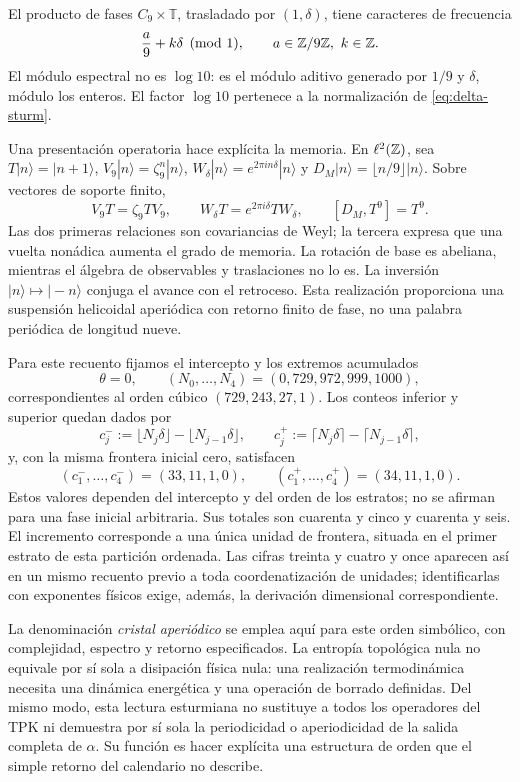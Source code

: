 El producto de fases \(C_9\times\mathbb T\), trasladado por \((1,\delta)\), tiene caracteres de frecuencia
\[
 \frac a9+k\delta\pmod1,\qquad a\in\mathbb Z/9\mathbb Z,\ k\in\mathbb Z.
\]
El módulo espectral no es \(\log10\): es el módulo aditivo generado por \(1/9\) y \(\delta\), módulo los enteros. El factor \(\log10\) pertenece a la normalización de \eqref{eq:delta-sturm}.

Una presentación operatoria hace explícita la memoria. En \(\ell^2(\mathbb Z)\), sea \(T|n\rangle=|n+1\rangle\), \(V_9|n\rangle=\zeta_9^n|n\rangle\), \(W_\delta|n\rangle=e^{2\pi i n\delta}|n\rangle\) y \(D_M|n\rangle=\lfloor n/9\rfloor|n\rangle\). Sobre vectores de soporte finito,
\begin{equation}
 V_9T=\zeta_9TV_9,\qquad
 W_\delta T=e^{2\pi i\delta}TW_\delta,\qquad
 [D_M,T^9]=T^9.
 \label{eq:weyl-relojes}
\end{equation}
Las dos primeras relaciones son covariancias de Weyl; la tercera expresa que una vuelta nonádica aumenta el grado de memoria. La rotación de base es abeliana, mientras el álgebra de observables y traslaciones no lo es. La inversión \(|n\rangle\mapsto|-n\rangle\) conjuga el avance con el retroceso. Esta realización proporciona una suspensión helicoidal aperiódica con retorno finito de fase, no una palabra periódica de longitud nueve.



Para este recuento fijamos el intercepto y los extremos acumulados
\[
 \theta=0,\qquad
 (N_0,\ldots,N_4)=(0,729,972,999,1000),
\]
correspondientes al orden cúbico \((729,243,27,1)\). Los conteos inferior y
superior quedan dados por
\[
 c_j^-:=\lfloor N_j\delta\rfloor-\lfloor N_{j-1}\delta\rfloor,
 \qquad
 c_j^+:=\lceil N_j\delta\rceil-\lceil N_{j-1}\delta\rceil,
\]
y, con la misma frontera inicial cero, satisfacen
\[
 (c_1^-,\ldots,c_4^-)=(33,11,1,0),\qquad
 (c_1^+,\ldots,c_4^+)=(34,11,1,0).
\]
Estos valores dependen del intercepto y del
orden de los estratos; no se afirman para una fase inicial arbitraria. Sus
totales son cuarenta y cinco y cuarenta y seis. El incremento corresponde a
una única unidad de frontera, situada en el primer estrato de esta partición
ordenada. Las cifras treinta y cuatro y once aparecen así en un mismo recuento
previo a toda coordenatización de unidades; identificarlas con exponentes físicos exige,
además, la derivación dimensional correspondiente.

La denominación \emph{cristal aperiódico} se emplea aquí para este orden simbólico, con complejidad, espectro y retorno especificados. La entropía topológica nula no equivale por sí sola a disipación física nula: una realización termodinámica necesita una dinámica energética y una operación de borrado definidas. Del mismo modo, esta lectura esturmiana no sustituye a todos los operadores del TPK ni demuestra por sí sola la periodicidad o aperiodicidad de la salida completa de \(\alpha\). Su función es hacer explícita una estructura de orden que el simple retorno del calendario no describe.




